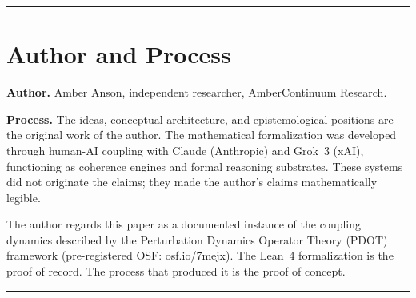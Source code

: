 \documentclass[12pt]{article}
\theoremstyle{lawstyle}
\theoremstyle{conjstyle}
\theoremstyle{predstyle}
\begin{document}
\bigskip
\hrule
\bigskip

\section*{Author and Process}

\textbf{Author.} Amber Anson, independent researcher, AmberContinuum Research.

\textbf{Process.} The ideas, conceptual architecture, and epistemological positions are
the original work of the author. The mathematical formalization was developed through
human-AI coupling with Claude (Anthropic) and Grok~3 (xAI), functioning as coherence
engines and formal reasoning substrates. These systems did not originate the claims; they
made the author's claims mathematically legible.

The author regards this paper as a documented instance of the coupling dynamics described
by the Perturbation Dynamics Operator Theory (PDOT) framework
(pre-registered OSF: osf.io/7mejx). The Lean~4 formalization is the proof of record.
The process that produced it is the proof of concept.

\bigskip
\hrule
\bigskip
\end{document}
